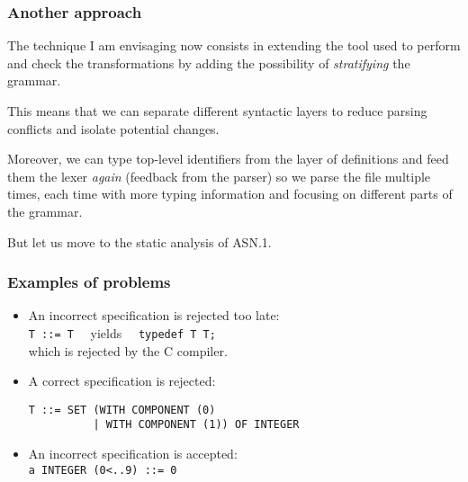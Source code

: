 \documentclass[compress,dvips,xcolor={dvipsnames},t]{beamer}
\newcommand\ASN{\textsf{ASN.1}\xspace}
\begin{document}
\begin{frame}
\frametitle{Another approach}

The technique I am envisaging now consists in extending the tool used
to perform and check the transformations by adding the possibility of
\emph{stratifying} the grammar.

\bigskip

This means that we can separate different syntactic layers to reduce
parsing conflicts and isolate potential changes. 

\bigskip

Moreover, we can type top-level identifiers from the layer of
definitions and feed them the lexer \emph{again} (feedback from the
parser) so we parse the file multiple times, each time with more
typing information and focusing on different parts of the grammar.

\bigskip

But let us move to the static analysis of \ASN.

\end{frame}


\begin{frame}[containsverbatim]
\frametitle{Examples of problems}

\begin{itemize}

  \item An incorrect specification is rejected too late:\\
        \verb+T ::= T+ \ \ yields \ \ \verb+typedef T T;+\\
        which is rejected by the C compiler.

\bigskip

  \item A correct specification is rejected:
\begin{verbatim}
T ::= SET (WITH COMPONENT (0) 
          | WITH COMPONENT (1)) OF INTEGER
\end{verbatim}

\bigskip

   \item An incorrect specification is accepted:\\
         \verb+a INTEGER (0<..9) ::= 0+

\end{itemize}

\end{frame}

\end{document}
